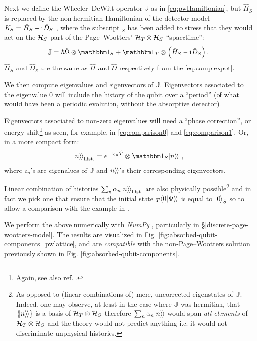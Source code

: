 Next we define the Wheeler--DeWitt operator $\mathbb{J}$ as in
\eqref{eq:pwHamiltonian}, but $\hat{H}_S$ is replaced by the non-hermitian
Hamiltonian of the detector model
$\mathit{K}_S = \hat{H}_S - \mathrm{i}\mkern1mu \hat{D}_S$
\parencite{RuschhauptAbsorption},
where the subscript $_S$ has been added to stress
that they would act on the $\mathcal{H}_S$ part
of the Page--Wootters' $\mathcal{H}_T \otimes \mathcal{H}_S$ ``spacetime'':
\begin{equation}
  \mathbb{J} = \hbar\hat{\Omega}\ox\idop_S + \idop_T\ox\qty(\hat{H}_S -\iu \hat{D}_S) \,\text{.}
\end{equation}
$\hat{H}_S$ and $\hat{D}_S$ are the same as $\hat{H}$ and $\hat{D}$
respectively from the \eqref{eq:complexpot}.

We then compute eigenvalues and eigenvectors of $\mathbb{J}$.
Eigenvectors associated to the eigenvalue $0$ will include
the history of the qubit over a ``period''
(of what would have been a periodic evolution, without the absorptive detector).

Eigenvectors associated to non-zero eigenvalues will need a ``phase correction'',
or energy shift\footnote{ Again, see also ref. \cite[\S ``The Zero-eigenvalue'']{Lloyd:Time}. }
as seen, for example, in \eqref{eq:comparison0} and \eqref{eq:comparison1}.
Or, in a more compact form:
\begin{equation}
  \dket{n}_{\text{hist.}} = e^{-\iu \epsilon_n \hat{T}} \ox \idop_S \dket{n}
  \,\text{,}
\end{equation}
where $\epsilon_n$'s are eigenalues of $\mathbb{J}$ and
$\hspace{-0.300em}\left.\left| n \right\rangle\hspace{-0.115em}\right\rangle$'s their corresponding eigenvectors.

Linear combination of histories $\sum_n \alpha_n \hspace{-0.300em}\left.\left| n \right\rangle\hspace{-0.115em}\right\rangle_{\text{hist.}}$
are also physically possible\footnote{
  As opposed to (linear combinations of) mere, uncorrected eigenstates of $\mathbb{J}$.
  Indeed, one may observe,
  at least in the case where $\mathbb{J}$ was hermitian,
  that $\left\{\hspace{-0.300em}\left.\left| n \right\rangle\hspace{-0.115em}\right\rangle\right\}$ is a basis
  of $\mathcal{H}_T \otimes \mathcal{H}_S$ therefore
  $\sum_n \alpha_n \hspace{-0.300em}\left.\left| n \right\rangle\hspace{-0.115em}\right\rangle$ would span \emph{all elements}
  of $\mathcal{H}_T \otimes \mathcal{H}_S$ and the theory would not predict anything i.e.
  it would not discriminate unphysical histories.
}
and in fact we pick
one that ensure that the initial state ${}_{T}\hspace{-0.300em}\left.\left\langle 0 \middle| \Psi \right\rangle\hspace{-0.115em}\right\rangle$ is equal to $\ket{0}_S$
so to allow a comparison with the example in \cite{RuschhauptAbsorption}.

We perform the above numerically with \emph{NumPy} \parencite{comp:numpy},
particularly in
\S \ref{discrete-page-wootters-model}.
The results are visualized in
Fig. \ref{fig:absorbed-qubit-components_pwlattice},
and are \emph{compatible} with the non-Page--Wootters
solution previously shown in Fig. \ref{fig:absorbed-qubit-components}.

